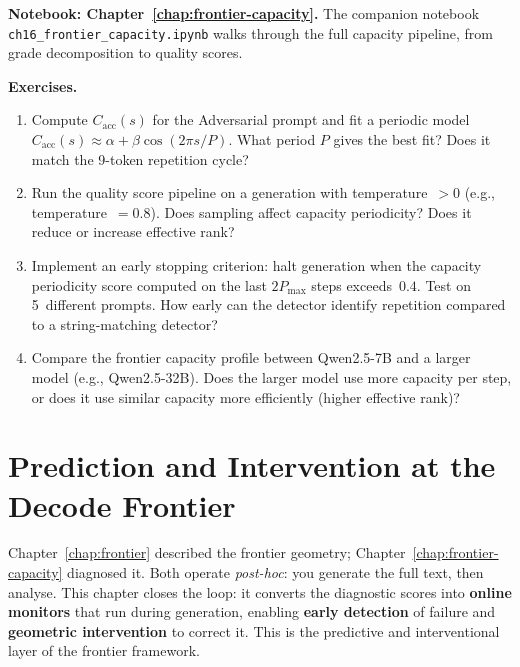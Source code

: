 \documentclass[11pt, twoside, openright]{memoir}
\numberwithin{equation}{chapter}
\begin{document}
\begin{tryit}
\textbf{Notebook: Chapter~\ref{chap:frontier-capacity}.}
The companion notebook
\texttt{ch16\_frontier\_capacity.ipynb} walks through the full
capacity pipeline, from grade decomposition to quality scores.

\medskip
\textbf{Exercises.}

\begin{enumerate}[nosep]
\item Compute $C_{\mathrm{acc}}(s)$ for the Adversarial prompt
  and fit a periodic model $C_{\mathrm{acc}}(s) \approx \alpha +
  \beta \cos(2\pi s / P)$.  What period $P$ gives the best fit?
  Does it match the 9-token repetition cycle?

\item Run the quality score pipeline on a generation with
  temperature~$> 0$ (e.g., temperature~$= 0.8$).  Does
  sampling affect capacity periodicity?  Does it reduce or
  increase effective rank?

\item Implement an early stopping criterion: halt generation
  when the capacity periodicity score computed on the last
  $2P_{\max}$ steps exceeds~$0.4$.  Test on 5~different prompts.
  How early can the detector identify repetition compared to a
  string-matching detector?

\item Compare the frontier capacity profile between Qwen2.5-7B and
  a larger model (e.g., Qwen2.5-32B).  Does the larger model use
  more capacity per step, or does it use similar capacity more
  efficiently (higher effective rank)?
\end{enumerate}
\end{tryit}


\chapter{Prediction and Intervention at the Decode Frontier}
\label{chap:frontier-prediction}

\begin{whycare}
Chapter~\ref{chap:frontier} described the frontier geometry;
Chapter~\ref{chap:frontier-capacity} diagnosed it.
Both operate \emph{post-hoc}: you generate the full text, then
analyse.
This chapter closes the loop: it converts the diagnostic scores
into \textbf{online monitors} that run during generation, enabling
\textbf{early detection} of failure and \textbf{geometric
intervention} to correct it.
This is the predictive and interventional layer of the
frontier framework.
\end{whycare}
\end{document}
